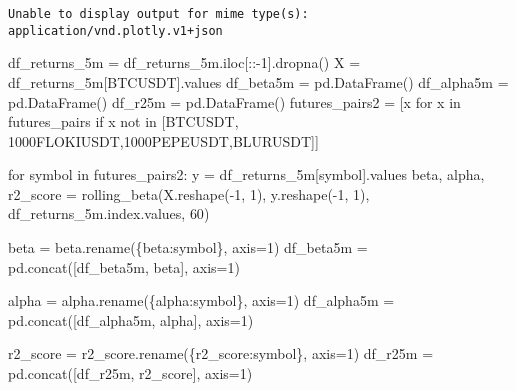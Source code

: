 \documentclass[
  letterpaper,
  DIV=11,
  numbers=noendperiod]{scrartcl}
\newenvironment{Shaded}{\begin{snugshade}}{\end{snugshade}}
\newcommand{\ControlFlowTok}[1]{\textcolor[rgb]{0.00,0.23,0.31}{#1}}
\newcommand{\DecValTok}[1]{\textcolor[rgb]{0.68,0.00,0.00}{#1}}
\newcommand{\KeywordTok}[1]{\textcolor[rgb]{0.00,0.23,0.31}{#1}}
\newcommand{\NormalTok}[1]{\textcolor[rgb]{0.00,0.23,0.31}{#1}}
\newcommand{\OperatorTok}[1]{\textcolor[rgb]{0.37,0.37,0.37}{#1}}
\newcommand{\StringTok}[1]{\textcolor[rgb]{0.13,0.47,0.30}{#1}}
\begin{document}
\begin{verbatim}
Unable to display output for mime type(s): application/vnd.plotly.v1+json
\end{verbatim}

\begin{Shaded}
\begin{Highlighting}[]
\NormalTok{df\_returns\_5m }\OperatorTok{=}\NormalTok{ df\_returns\_5m.iloc[::}\OperatorTok{{-}}\DecValTok{1}\NormalTok{].dropna()}
\NormalTok{X }\OperatorTok{=}\NormalTok{ df\_returns\_5m[}\StringTok{\textquotesingle{}BTCUSDT\textquotesingle{}}\NormalTok{].values}
\NormalTok{df\_beta5m }\OperatorTok{=}\NormalTok{ pd.DataFrame()}
\NormalTok{df\_alpha5m }\OperatorTok{=}\NormalTok{ pd.DataFrame()}
\NormalTok{df\_r25m }\OperatorTok{=}\NormalTok{ pd.DataFrame()}
\NormalTok{futures\_pairs2 }\OperatorTok{=}\NormalTok{ [x }\ControlFlowTok{for}\NormalTok{ x }\KeywordTok{in}\NormalTok{ futures\_pairs }\ControlFlowTok{if}\NormalTok{ x }\KeywordTok{not} \KeywordTok{in}\NormalTok{  [}\StringTok{\textquotesingle{}BTCUSDT\textquotesingle{}}\NormalTok{, }\StringTok{\textquotesingle{}1000FLOKIUSDT\textquotesingle{}}\NormalTok{,}\StringTok{\textquotesingle{}1000PEPEUSDT\textquotesingle{}}\NormalTok{,}\StringTok{\textquotesingle{}BLURUSDT\textquotesingle{}}\NormalTok{]]}

\ControlFlowTok{for}\NormalTok{ symbol }\KeywordTok{in}\NormalTok{ futures\_pairs2:}
\NormalTok{    y }\OperatorTok{=}\NormalTok{ df\_returns\_5m[symbol].values}
\NormalTok{    beta, alpha, r2\_score }\OperatorTok{=}\NormalTok{ rolling\_beta(X.reshape(}\OperatorTok{{-}}\DecValTok{1}\NormalTok{, }\DecValTok{1}\NormalTok{), y.reshape(}\OperatorTok{{-}}\DecValTok{1}\NormalTok{, }\DecValTok{1}\NormalTok{), df\_returns\_5m.index.values, }\DecValTok{60}\NormalTok{)}

\NormalTok{    beta }\OperatorTok{=}\NormalTok{ beta.rename(\{}\StringTok{\textquotesingle{}beta\textquotesingle{}}\NormalTok{:symbol\}, axis}\OperatorTok{=}\DecValTok{1}\NormalTok{)}
\NormalTok{    df\_beta5m }\OperatorTok{=}\NormalTok{ pd.concat([df\_beta5m, beta], axis}\OperatorTok{=}\DecValTok{1}\NormalTok{)}

\NormalTok{    alpha }\OperatorTok{=}\NormalTok{ alpha.rename(\{}\StringTok{\textquotesingle{}alpha\textquotesingle{}}\NormalTok{:symbol\}, axis}\OperatorTok{=}\DecValTok{1}\NormalTok{)}
\NormalTok{    df\_alpha5m }\OperatorTok{=}\NormalTok{ pd.concat([df\_alpha5m, alpha], axis}\OperatorTok{=}\DecValTok{1}\NormalTok{)}

\NormalTok{    r2\_score }\OperatorTok{=}\NormalTok{ r2\_score.rename(\{}\StringTok{\textquotesingle{}r2\_score\textquotesingle{}}\NormalTok{:symbol\}, axis}\OperatorTok{=}\DecValTok{1}\NormalTok{)}
\NormalTok{    df\_r25m }\OperatorTok{=}\NormalTok{ pd.concat([df\_r25m, r2\_score], axis}\OperatorTok{=}\DecValTok{1}\NormalTok{)}
\end{Highlighting}
\end{Shaded}
\end{document}
